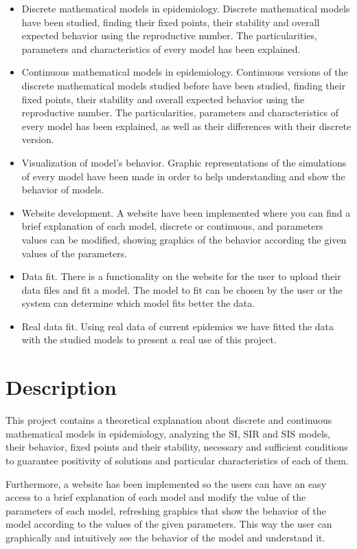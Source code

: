 \begin{itemize}
\item Discrete mathematical models in epidemiology. Discrete mathematical models  have been studied, finding their fixed points, their stability and overall expected behavior using the reproductive number. The particularities, parameters and characteristics of every model has been explained.
\item Continuous mathematical models in epidemiology. Continuous versions of the discrete mathematical models studied before have been studied, finding their fixed points, their stability and overall expected behavior using the reproductive number. The particularities, parameters and characteristics of every model has been explained, as well as their differences with their discrete version.
\item Visualization of model's behavior. Graphic representations of the simulations of every model have been made in order to help understanding and show the behavior of models.
\item Website development. A website have been implemented where you can find a brief explanation of each model, discrete or continuous, and parameters values can be modified, showing graphics of the behavior according the given values of the parameters.
\item Data fit. There is a functionality on the website for the user to upload their data files and fit a model. The model to fit can be chosen by the user or the system can determine which model fits better the data.
\item Real data fit. Using real data of current epidemics we have fitted the data with the studied models to present a real use of this project.
\end{itemize}

\section*{Description}

This project contains a theoretical explanation about discrete and continuous mathematical models in epidemiology, analyzing the SI, SIR and SIS models, their behavior, fixed points and their stability, necessary and sufficient conditions to guarantee positivity of solutions and particular characteristics of each of them. 

Furthermore, a website has been implemented so the users can have an easy access to a brief explanation of each model and modify the value of the parameters of each model, refreshing graphics that show the behavior of the model according to the values of the given parameters. This way the user can graphically and intuitively see the behavior of the model and understand it.

